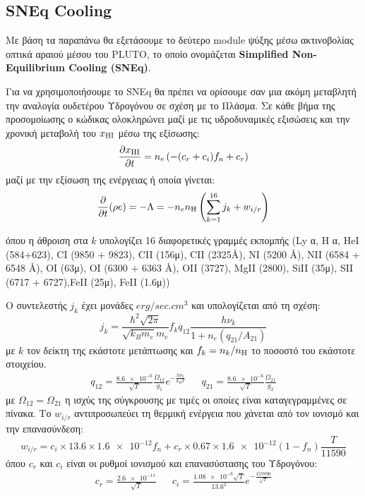 	\subsection{SNEq Cooling}
	Με βάση τα παραπάνω θα εξετάσουμε το δεύτερο module ψύξης μέσω ακτινοβολίας οπτικά αραιού μέσου του PLUTO, το οποίο ονομάζεται \textbf{Simplified Non-Equilibrium Cooling (SNEq)}. 
	
	Για να χρησιμοποιήσουμε το SNEq θα πρέπει να ορίσουμε σαν μια ακόμη μεταβλητή την
	αναλογία ουδετέρου Υδρογόνου σε σχέση με το Πλάσμα.
	Σε κάθε βήμα της προσομοίωσης ο κώδικας ολοκληρώνει μαζί με τις υδροδυναμικές εξισώσεις και την χρονική μεταβολή του $x_{\ce{HI}}$ μέσω της εξίσωσης:
	\begin{equation}
	\pdv{x_{\ce{HI}}}{t}=n_e \left( -(c_r+c_i)f_n+c_r\right) 
	\end{equation}
	μαζί με την εξίσωση της ενέργειας ή οποία γίνεται:
	\begin{equation}
	\pdv{t}(\rho e)=-\Lambda=-n_e n_{\ce{H}} \left( \sum\limits_{k=1}^{16}j_k +w_{i/r} \right) 
	\end{equation}
	
	όπου η άθροιση στα $k$ υπολογίζει 16 διαφορετικές γραμμές εκπομπής 
	(Ly α, H α, HeI (584+623), CI (9850 + 9823), CII (156μ), CII (2325Å), NI (5200 Å),
	NII (6584 + 6548 Å), OI (63μ), OI (6300 + 6363 Å), OII (3727), MgII (2800), SiII (35μ), SII (6717 + 6727),FeII (25μ), FeII (1.6μ))
	
	Ο συντελεστής $j_k$ έχει μονάδες $\si{erg/sec . cm^3}$ και υπολογίζεται από τη σχέση:
	\begin{equation}
	j_k=\frac{\hbar^2 \sqrt{2\pi}}{\sqrt{k_B m_e}m_e}f_k q_{12}\frac{h \nu _k}{1+n_e (q_{21}/A_{21})}
	\end{equation}
	με $k$ τον δείκτη της εκάστοτε μετάπτωσης και $f_k=n_k/n_{\ce{H}}$ το ποσοστό του εκάστοτε στοιχείου.
	\begin{align}
	q_{12}=\frac{\num{8.6e-6}}{\sqrt{T}}\frac{\Omega _{12}}{g_1}e^{-\frac{h\nu _k}{k_B T}} 
	&&
	q_{21}=\frac{\num{8.6e-6}}{\sqrt{T}}\frac{\Omega _{21}}{g_2}
	\end{align} 
	με $\Omega _{12} = \Omega _{21}$ η ισχύς της σύγκρουσης με τιμές οι οποίες είναι καταγεγραμμένες σε πίνακα.
	Το $w_{i/r}$ αντιπροσωπεύει τη θερμική ενέργεια που χάνεται από τον ιονισμό και την επανασύνδεση:
	\begin{equation}
	w_{i/r} = c_i\times \num{13.6}\times \num{1.6e-12} f_n +c_r \times \num{0.67}\times \num{1.6e-12} (1-f_n) \frac{T}{11590}
	\end{equation}
	όπου $c_r$ και $c_i$ είναι οι ρυθμοί ιονισμού και επανασύστασης του Υδρογόνου:
	\begin{align}
	c_r=\frac{\num{2.6e-11}}{\sqrt{T}} 
	&& 
	c_i=\frac{\num{1.08e-8}\sqrt{T}}{\num{13.6}^2} e^{-\frac{\num{157890}}{\sqrt{T}}}
	\end{align}
	
